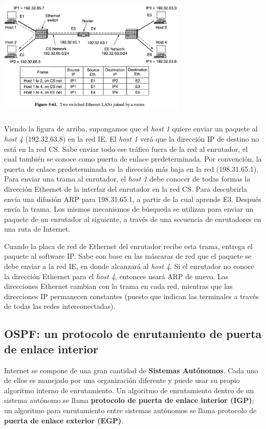 \documentclass[10pt,a4paper]{report}
\begin{document}
		\begin{center}
			\includegraphics[width=9cm, height=6cm]{./imagenes/arp.png} 
		\end{center}

	\par Viendo la figura de arriba, supongamos que el \textit{host 1} quiere enviar un paquete al \textit{host 4} (192.32.63.8) en la red IE. El \textit{host 1} verá que la dirección IP de destino no está en la red CS. Sabe enviar todo ese tráfico fuera de la red al enrutador, el cual también se conoce como puerta de enlace predeterminada. Por convención, la puerta de enlace predeterminada es la dirección más baja en la red (198.31.65.1). Para enviar una trama al enrutador, el \textit{host 1} debe conocer de todas formas la dirección Ethernet de la interfaz del enrutador en la red CS. Para descubrirla envía una difusión ARP para 198.31.65.1, a partir de la cual aprende E3. Después envía la trama. Los mismos mecanismos de búsqueda se utilizan para enviar un paquete de un enrutador al siguiente, a través de una secuencia de enrutadores en una ruta de Internet.
	
	\par Cuando la placa de red de Ethernet del enrutador recibe esta trama, entrega el paquete al software IP. Sabe con base en las máscaras de red que el paquete se debe enviar a la red IE, en donde alcanzará al \textit{host 4}. Si el enrutador no conoce la dirección Ethernet para el \textit{host 4}, entonces usará ARP de nuevo. Las direcciones Ethernet cambian con la trama en cada red, mientras que las direcciones IP permanecen constantes (puesto que indican las terminales a través de todas las redes interconectadas).
	
\subsection{OSPF: un protocolo de enrutamiento de puerta de enlace interior}
	\par Internet se compone de una gran cantidad de \textbf{Sistemas Autónomos}. Cada uno de ellos es manejado por una organización diferente y puede usar su propio algoritmo interno de enrutamiento. Un algoritmo de enrutamiento dentro de un sistema autónomo se llama \textbf{protocolo de puerta de enlace interior (IGP)}; un algoritmo para enrutamiento entre sistemas autónomos se llama protocolo de \textbf{puerta de enlace exterior (EGP)}.
\end{document}
